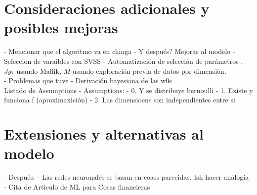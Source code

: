 \documentclass[../Main/Main.tex]{subfiles}
\begin{document}
\section{Consideraciones adicionales y posibles mejoras}

- Mencionar que el algoritmo va en chinga
- Y después? Mejoras al modelo
- Seleccion de varaibles con SVSS
- Automatización de selección de parámetros , $J y \tau$ usando Mallik, $M$ usando exploración previa de datos por dimensión. \\

- Problemas que tuve
- Derivación bayesiana de las w0s \\

Listado de Assumptions
- Assumptions:
- 0. Y se distribuye bernoulli
- 1. Existe y funciona f (aproximaxición)
- 2. Las dimensioens son independientes entre si

\section{Extensiones y alternativas al modelo}
- Después:
- Las redes neuronales se basan en coass parecidas. Ish hacer análogía
- Cita de Articulo de ML para Cosas financieras \\
\end{document}
